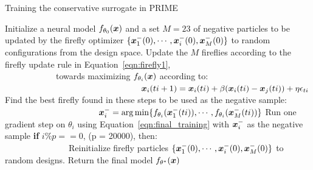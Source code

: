 \begin{algorithm}[ht] %
  \caption{Training the conservative surrogate in PRIME}\label{alg:prime}
  \begin{algorithmic}[1]
    \State Initialize a neural model $f_{\theta_0}({\boldsymbol{x}})$ and a set $M = 23$ of negative particles to be updated by the firefly optimizer $\{{\boldsymbol{x}}^{-}_1(0), \cdots,  {\boldsymbol{x}}^{-}_i(0), {\boldsymbol{x}}^{-}_M(0)\}$ to random configurations from the design space.
          \State Update the $M$ fireflies according to the firefly update rule in Equation~\ref{eqn:firefly1},\\ ~~~~~~~~~~~~towards maximizing $f_{\theta_i}({\boldsymbol{x}})$ according to: \hfill {}\\ ~~~~~~~~~~~~~~~~~~~~~~~~~~~~~~~~${{\boldsymbol{x}}_{i}(ti+ 1) = {\boldsymbol{x}}_{i}(ti) + \beta({\boldsymbol{x}}_{i}(ti) - {\boldsymbol{x}}_{j}(ti)) + {\eta}\epsilon_{ti}}$
      \EndFor
      \State Find the best firefly found in these steps to be used as the negative sample:\\ ~~~~~~~~~~~~~~~~~~~~~~${\boldsymbol{x}}^{-}_i = \arg \min \{f_{\theta_i}({\boldsymbol{x}}^{-}_1(t i)), \cdots, f_{\theta_i}({\boldsymbol{x}}^{-}_M(t i))\}$ \hfill {}
      \State Run one gradient step on $\theta_i$ using Equation~\ref{eqn:final_training} with ${\boldsymbol{x}}^{-}_i$ as the negative sample
      \State \textbf{if} $i \% p == 0$, (p = 20000), then: \hfill {} \\~~~~~~~~~~~~~~~Reinitialize firefly particles  $\{{\boldsymbol{x}}^{-}_1(0), \cdots,  {\boldsymbol{x}}^{-}_i(0), {\boldsymbol{x}}^{-}_M(0)\}$ to random designs.
    \EndFor
    \State Return the final model $f_{\theta^*}({\boldsymbol{x}})$
  \end{algorithmic}
\end{algorithm}

